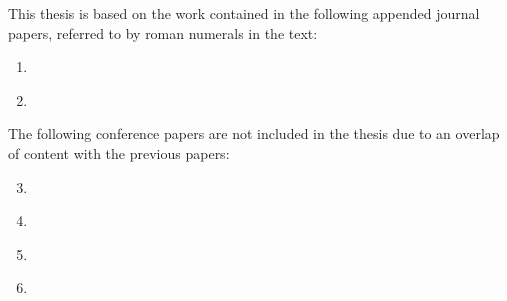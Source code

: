 \begin{refsection}

This thesis is based on the work contained in the following appended journal papers,
referred to by roman numerals in the text:
\begin{enumerate}[I]
 \item \label{paper:turbulence}  %
 \item \label{paper:overview}  %
\end{enumerate}
The following conference papers are not included in the thesis due to an overlap
of content with the previous papers:
\begin{enumerate}[I]
 \setcounter{enumi}{2}
 \item \label{paper:forum2014}  %
 \item \label{paper:asa2014}  %
 \item \label{paper:euronoise2015}  %
 \item \label{paper:internoise2016}  %
\end{enumerate}

\end{refsection}
